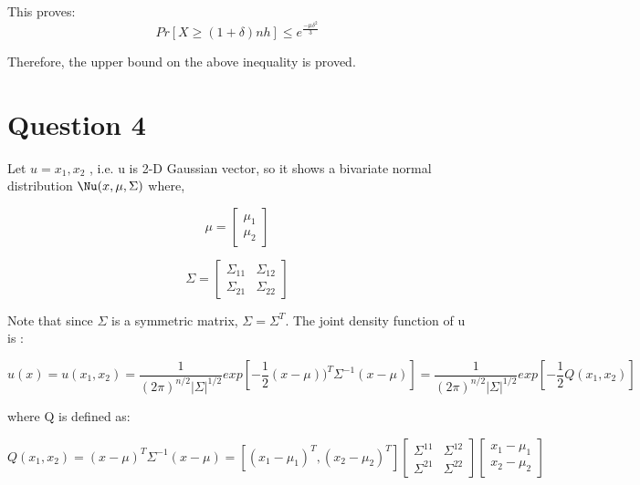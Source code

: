 \documentclass[12pt,a4paper]{article}
\begin{document}
This proves:
\begin{equation*}
     Pr[ X \geq (1+\delta)nh ] \leq e^{\frac{-\mu\delta^2}{3}}   
\end{equation*}

Therefore, the upper bound on the above inequality is proved.


\section*{Question 4}
Let $u = {x_1,x_2}$ , i.e. u is 2-D Gaussian vector, so it shows a bivariate normal distribution $\Nu(x,\mu,\Sigma)$ where, 

\begin{equation*}
\mu = \begin{bmatrix}
\mu_1\\ 
\mu_2
\end{bmatrix}
\end{equation*}

\begin{equation*}
\Sigma = \begin{bmatrix}
\Sigma_{11} & \Sigma_{12} \\ 
\Sigma_{21} & \Sigma_{22} 
\end{bmatrix}
\end{equation*}

Note that since $\Sigma$ is a symmetric matrix, $\Sigma = \Sigma^T$.
The joint density function of u is :

\begin{equation*}
u(x) = u(x_1,x_2) = \frac{1}{(2\pi )^{n/2}|\Sigma|^{1/2}}exp[-\frac{1}{2}(x-\mu))^T\Sigma^{-1}(x-\mu)] =  \frac{1}{(2\pi )^{n/2}|\Sigma|^{1/2}}exp[-\frac{1}{2}Q(x_1,x_2)]
\end{equation*}

where Q is defined as:

\begin{equation*}

Q(x_1,x_2) = (x-\mu)^T\Sigma^{-1}(x-\mu) 
		 = [(x_1-\mu_1)^T,(x_2-\mu_2)^T]\begin{bmatrix}\Sigma^{11} & \Sigma^{12} \\ 
\Sigma^{21} & \Sigma^{22} 
\end{bmatrix} \begin{bmatrix}x_1-\mu_1 \\ x_2-\mu_2 \end{bmatrix}

\end{equation*}
\end{document}

